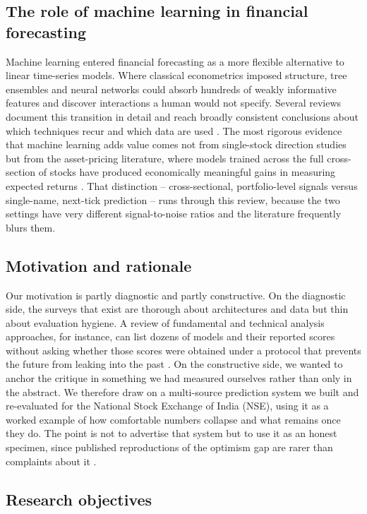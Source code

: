 \documentclass[10pt,a4paper,twocolumn]{article}
\begin{document}
\subsection{The role of machine learning in financial forecasting}

Machine learning entered financial forecasting as a more flexible alternative to linear time-series models. Where classical econometrics imposed structure, tree ensembles and neural networks could absorb hundreds of weakly informative features and discover interactions a human would not specify. Several reviews document this transition in detail and reach broadly consistent conclusions about which techniques recur and which data are used \cite{henrique2019,bustos2020,kumbure2022}. The most rigorous evidence that machine learning adds value comes not from single-stock direction studies but from the asset-pricing literature, where models trained across the full cross-section of stocks have produced economically meaningful gains in measuring expected returns \cite{gu2020}. That distinction -- cross-sectional, portfolio-level signals versus single-name, next-tick prediction -- runs through this review, because the two settings have very different signal-to-noise ratios and the literature frequently blurs them.

\subsection{Motivation and rationale}

Our motivation is partly diagnostic and partly constructive. On the diagnostic side, the surveys that exist are thorough about architectures and data but thin about evaluation hygiene. A review of fundamental and technical analysis approaches, for instance, can list dozens of models and their reported scores without asking whether those scores were obtained under a protocol that prevents the future from leaking into the past \cite{nti2020}. On the constructive side, we wanted to anchor the critique in something we had measured ourselves rather than only in the abstract. We therefore draw on a multi-source prediction system we built and re-evaluated for the National Stock Exchange of India (NSE), using it as a worked example of how comfortable numbers collapse and what remains once they do. The point is not to advertise that system but to use it as an honest specimen, since published reproductions of the optimism gap are rarer than complaints about it \cite{arnott2019}.

\subsection{Research objectives}
\end{document}
